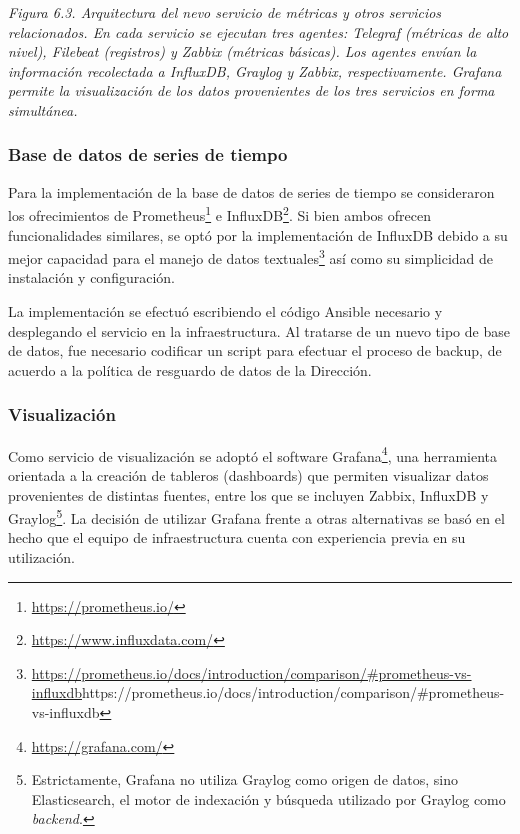 \textit{Figura 6.3. Arquitectura del nevo servicio de métricas y otros servicios relacionados. En cada servicio se ejecutan tres agentes: Telegraf (métricas de alto nivel), Filebeat (registros) y Zabbix (métricas básicas). Los agentes envían la información recolectada a InfluxDB, Graylog y Zabbix, respectivamente. Grafana permite la visualización de los datos provenientes de los tres servicios en forma simultánea.}

\subsubsection{Base de datos de series de tiempo}

Para la implementación de la base de datos de series de tiempo se consideraron los ofrecimientos de Prometheus\footnote{ \href{https://prometheus.io/}{https://prometheus.io/} } e InfluxDB\footnote{ \href{https://www.influxdata.com/}{https://www.influxdata.com/} }. Si bien ambos ofrecen funcionalidades similares, se optó por la implementación de InfluxDB debido a su mejor capacidad para el manejo de datos textuales\footnote{ \url{https://prometheus.io/docs/introduction/comparison/\#prometheus-vs-influxdb}{https://prometheus.io/docs/introduction/comparison/\#prometheus-vs-influxdb} } así como su simplicidad de instalación y configuración.

La implementación se efectuó escribiendo el código Ansible necesario y desplegando el servicio en la infraestructura. Al tratarse de un nuevo tipo de base de datos, fue necesario codificar un script para efectuar el proceso de backup, de acuerdo a la política de resguardo de datos de la Dirección.

\subsubsection{Visualización}

Como servicio de visualización se adoptó el software Grafana\footnote{ \href{https://grafana.com/}{https://grafana.com/} }, una herramienta orientada a la creación de tableros (dashboards) que permiten visualizar datos provenientes de distintas fuentes, entre los que se incluyen Zabbix, InfluxDB y Graylog\footnote{ Estrictamente, Grafana no utiliza Graylog como origen de datos, sino Elasticsearch, el motor de indexación y búsqueda utilizado por Graylog como \textit{backend}.}. La decisión de utilizar Grafana frente a otras alternativas se basó en el hecho que el equipo de infraestructura cuenta con experiencia previa en su utilización.


